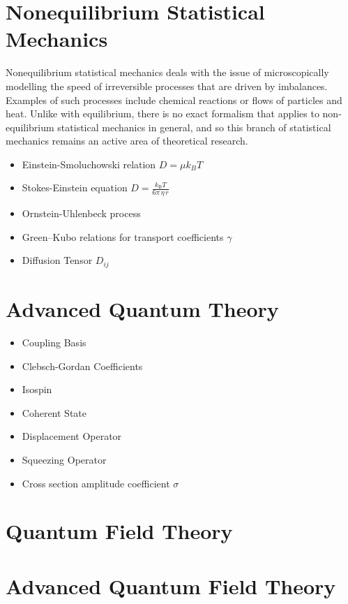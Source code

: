 \documentclass[10pt]{article}
\begin{document}
\section{Nonequilibrium Statistical Mechanics}
Nonequilibrium statistical mechanics deals with the issue of microscopically modelling the speed of irreversible processes that are driven by imbalances. Examples of such processes include chemical reactions or flows of particles and heat. Unlike with equilibrium, there is no exact formalism that applies to non-equilibrium statistical mechanics in general, and so this branch of statistical mechanics remains an active area of theoretical research.
\begin{itemize}
	\item Einstein-Smoluchowski relation $D = \mu k_B T$
	\item Stokes-Einstein equation $D=\frac{k_{\mathrm{B}}T}{6\pi \,\eta \,r} $
	\item Ornstein-Uhlenbeck process
	\item Green–Kubo relations for transport coefficients $\gamma$
	\item Diffusion Tensor $D_{ij}$ 
\end{itemize}
\section{Advanced Quantum Theory}
\begin{itemize}
	\item Coupling Basis
	\item Clebsch-Gordan Coefficients
	\item Isospin
	\item Coherent State
	\item Displacement Operator
	\item Squeezing Operator
	\item Cross section amplitude coefficient $\sigma$
\end{itemize}

\section{Quantum Field Theory}

\section{Advanced Quantum Field Theory}
\end{document}

